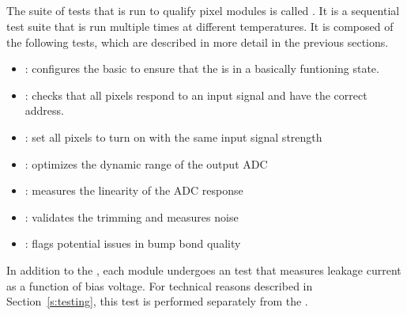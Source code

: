 
\newpage

\subsection{\fulltest}
\label{ss:fulltest}

The suite of tests that is run to qualify pixel modules is called
\fulltest. It is a sequential test suite that is run multiple times at
different temperatures. It is composed of the following tests, which
are described in more detail in the previous sections.
\begin{itemize}
  \item \pretest: configures the basic \dacs to ensure that the \roc is in a basically funtioning state.
  \item \alivetest: checks that all pixels respond to an input signal and have the correct address.
  \item \trimming: set all pixels to turn on with the same input signal strength
  \item \phopt: optimizes the dynamic range of the output ADC
  \item \gainped: measures the linearity of the ADC response
  \item \scurves: validates the trimming and measures noise
  \item \bb: flags potential issues in bump bond quality
\end{itemize}
In addition to the \fulltest, each module undergoes an \iv test that measures leakage current as a function of bias voltage.
For technical reasons described in Section~\ref{s:testing}, this test is performed separately from the \fulltest.
